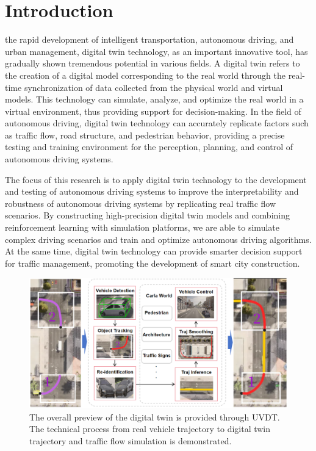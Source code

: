 \documentclass[lettersize,journal]{IEEEtran}
\begin{document}
\section{Introduction}

 the rapid development of intelligent transportation, autonomous driving, and urban management, digital twin technology, as an important innovative tool, has gradually shown tremendous potential in various fields\cite{Alpher17}. 
A digital twin refers to the creation of a digital model corresponding to the real world through the real-time synchronization of data collected from the physical world and virtual models\cite{Alpher20c}. 
This technology can simulate, analyze, and optimize the real world in a virtual environment, thus providing support for decision-making\cite{Alpher21b}. 
In the field of autonomous driving, digital twin technology can accurately replicate factors such as traffic flow, road structure, and pedestrian behavior, providing a precise testing and training environment for the perception, planning, and control of autonomous driving systems\cite{Alpher24}\cite{Alpher20d}.

The focus of this research is to apply digital twin technology to the development and testing of autonomous driving systems to improve the interpretability and robustness of autonomous driving systems by replicating real traffic flow scenarios\cite{Alpher24b}.
By constructing high-precision digital twin models and combining reinforcement learning with simulation platforms, we are able to simulate complex driving scenarios and train and optimize autonomous driving algorithms\cite{Alpher22c}. 
At the same time, digital twin technology can provide smarter decision support for traffic management, promoting the development of smart city construction\cite{Alpher17b}.

\begin{figure}[t]
	\centering
	\includegraphics[width=\linewidth]{picture/picture1.png} 
	\caption{The overall preview of the digital twin is provided through UVDT. The technical process from real vehicle trajectory to digital twin trajectory and traffic flow simulation is demonstrated.} 
	\label{fig:example} 
\end{figure}
\end{document}
